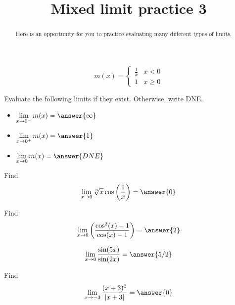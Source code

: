 \documentclass[handout]{ximera}
\title{Mixed limit practice 3}
\begin{document}
\begin{abstract}
Here is an opportunity for you to practice evaluating many different types of limits. 
\end{abstract}
\maketitle

\begin{exercise}
\[
m(x) = \begin{cases}
  \frac{1}{x}  & x < 0 \\
  1 & x \geq 0
\end{cases}
\]

Evaluate the following limits if they exist.  Otherwise, write DNE. 

\begin{itemize}

\item $\displaystyle\lim_{x \to 0^-} m(x) = \answer{\infty}$

\item $\displaystyle\lim_{x \to 0^+} m(x) = \answer{1}$

\item $\displaystyle\lim_{x \to 0} m(x) = \answer{DNE}$

\end{itemize}

\end{exercise}

\begin{exercise}
Find
\[ \displaystyle\lim_{x \to 0} \sqrt[3]{x} \cos \left(\frac{1}{x}\right) = \answer{0}\]
\end{exercise}
    
\begin{exercise}
Find
\[
\lim_{x\to0}\left(\frac{\cos^{2}(x)-1}{\cos(x)-1}\right)
= \answer{2}
\]
\end{exercise}

\begin{exercise}
\[\lim_{x \to 0} \frac{\sin(5x)}{\sin(2x)} = \answer{5/2}\]
\end{exercise}

\begin{exercise}
Find 
\[ \displaystyle\lim_{x \to -3} \frac{(x+3)^2}{|x+3|} = \answer{0} \]
\end{exercise}
\end{document}
